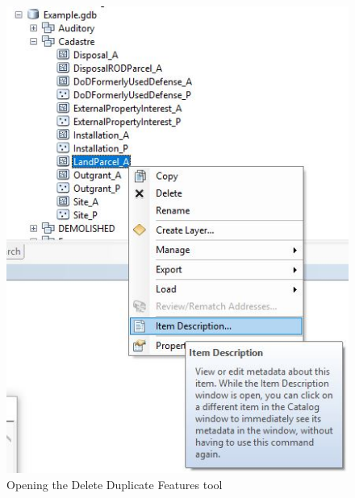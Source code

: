 \documentclass[openany]{book}
\theoremstyle{definition}
\theoremstyle{definition}
\theoremstyle{definition}
\theoremstyle{remark}
\begin{document}
\begin{figure}[H]

{\centering \includegraphics{figures/imMeta-after} 

}

\caption{Opening the Delete Duplicate Features tool}\label{fig:imMetaafter}
\end{figure}


\end{document}
